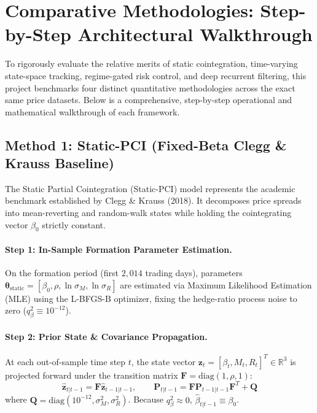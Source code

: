 \documentclass[11pt, a4paper]{article}
\begin{document}
\section{Comparative Methodologies: Step-by-Step Architectural Walkthrough}
\label{sec:comparative_methods}

To rigorously evaluate the relative merits of static cointegration, time-varying state-space tracking, regime-gated risk control, and deep recurrent filtering, this project benchmarks four distinct quantitative methodologies across the exact same price datasets. Below is a comprehensive, step-by-step operational and mathematical walkthrough of each framework.

\subsection{Method 1: Static-PCI (Fixed-Beta Clegg \& Krauss Baseline)}
\label{sec:method_static}
The Static Partial Cointegration (Static-PCI) model represents the academic benchmark established by Clegg \& Krauss (2018). It decomposes price spreads into mean-reverting and random-walk states while holding the cointegrating vector $\beta_0$ strictly constant.

\paragraph{Step 1: In-Sample Formation Parameter Estimation.}
On the formation period (first $2{,}014$ trading days), parameters $\bm{\theta}_{\text{static}} = [\beta_0, \rho, \ln\sigma_M, \ln\sigma_R]$ are estimated via Maximum Likelihood Estimation (MLE) using the L-BFGS-B optimizer, fixing the hedge-ratio process noise to zero ($q_\beta^2 \equiv 10^{-12}$).

\paragraph{Step 2: Prior State \& Covariance Propagation.}
At each out-of-sample time step $t$, the state vector $\mathbf{z}_t = [\beta_t, M_t, R_t]^T \in \mathbb{R}^3$ is projected forward under the transition matrix $\mathbf{F} = \text{diag}(1, \rho, 1)$:
\begin{equation}
    \hat{\mathbf{z}}_{t|t-1} = \mathbf{F} \hat{\mathbf{z}}_{t-1|t-1}, \qquad \mathbf{P}_{t|t-1} = \mathbf{F} \mathbf{P}_{t-1|t-1} \mathbf{F}^T + \mathbf{Q}
\end{equation}
where $\mathbf{Q} = \text{diag}(10^{-12}, \sigma_M^2, \sigma_R^2)$. Because $q_\beta^2 \approx 0$, $\hat{\beta}_{t|t-1} \equiv \beta_0$.
\end{document}
